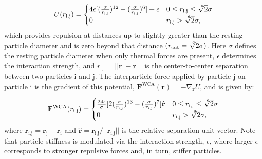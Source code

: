 \documentclass[twoside,twocolumn,9pt]{article}
\begin{document}
\begin{equation}\label{ljPotential}
U({r_\text{i,j}}) = 
	\begin{cases} 
      4\epsilon [(\frac{\sigma}{{r_\text{i,j}}})^{12} - (\frac{\sigma}{{r_\text{i,j}}})^6]+\epsilon & 0 \leq {r_\text{i,j}}\leq \sqrt[\leftroot{-3}\uproot{3}6]{2}\sigma \\
      0 & {r_\text{i,j}}> \sqrt[\leftroot{-3}\uproot{3}6]{2}\sigma, \\
   \end{cases}
\end{equation}
%
which provides repulsion at distances up to slightly greater than the resting particle diameter and is zero beyond that distance $(r_\text{cut}=\sqrt[\leftroot{-3}\uproot{3}6]{2}\sigma)$. 
Here $\sigma$ defines the resting particle diameter when only thermal forces are present, $\epsilon$ determines the interaction strength, and $r_\text{i,j} = ||{\mathbf{r}}_\text{j} - {\mathbf{r}}_\text{i}||$ is the center-to-center separation between two particles $\mathrm{i}$ and $\mathrm{j}$. 
The interparticle force applied by particle $\mathrm{j}$ on particle $\mathrm{i}$ is the gradient of this potential, $\mathbf{F}^{\text{WCA}}(\mathbf{r})=-\nabla_\mathbf{r} U$, and is given by:

\begin{equation}\label{ljForce}
\mathbf{F}^{\text{WCA}}(r_\text{i,j}) =
	\begin{cases} 
      \frac{24\epsilon}{\sigma} [2(\frac{\sigma}{r_\text{i,j}})^{13} - (\frac{\sigma}{r_\text{i,j}})^7] \hat{\mathbf{r}}& 0 \leq {r_\text{i,j}}\leq \sqrt[\leftroot{-3}\uproot{3}6]{2}\sigma \\
      0 & {r_\text{i,j}}> \sqrt[\leftroot{-3}\uproot{3}6]{2}\sigma, \\
   \end{cases}
\end{equation}
where $\mathbf{r}_\text{i,j}=\mathbf{r}_\text{j}-\mathbf{r}_\text{i}$ and $\hat{\mathbf{r}}=\mathbf{r}_\text{i,j}/||\mathbf{r}_\text{i,j}||$ is the relative separation unit vector. Note that particle stiffness is modulated via the interaction strength, $\epsilon$, where larger $\epsilon$ corresponds to stronger repulsive forces and, in turn, stiffer particles.
\end{document}
